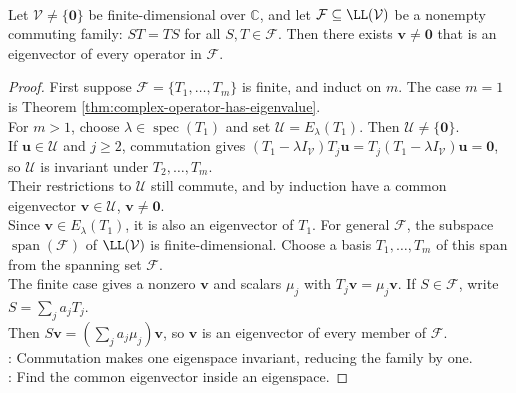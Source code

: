 \begin{theorem} \label{thm:commuting-family-common-eigenvector} \\
Let $\mathcal{V}\neq\{\mathbf{0}\}$ be finite-dimensional over $\mathbb{C}$, and let $\mathcal{F}\subseteq\LL(\mathcal{V})$ be a nonempty commuting family: $ST=TS$ for all $S,T\in\mathcal{F}$. Then there exists $\mathbf{v}\neq\mathbf{0}$ that is an eigenvector of every operator in $\mathcal{F}$.
\begin{proof} First suppose $\mathcal{F}=\{T_1,\ldots,T_m\}$ is finite, and induct on $m$. The case $m=1$ is Theorem \ref{thm:complex-operator-has-eigenvalue}.\\
For $m>1$, choose $\lambda\in\operatorname{spec}(T_1)$ and set $\mathcal{U}=E_{\lambda}(T_1)$. Then $\mathcal{U}\neq\{\mathbf{0}\}$.\\
If $\mathbf{u}\in\mathcal{U}$ and $j\geq2$, commutation gives $(T_1-\lambda I_{\mathcal{V}})T_j\mathbf{u} =T_j(T_1-\lambda I_{\mathcal{V}})\mathbf{u} =\mathbf{0}$, so $\mathcal{U}$ is invariant under $T_2,\ldots,T_m$.\\
Their restrictions to $\mathcal{U}$ still commute, and by induction have a common eigenvector $\mathbf{v}\in\mathcal{U}$, $\mathbf{v}\neq\mathbf{0}$.\\
Since $\mathbf{v}\in E_{\lambda}(T_1)$, it is also an eigenvector of $T_1$. For general $\mathcal{F}$, the subspace $\operatorname{span}(\mathcal{F})$ of $\LL(\mathcal{V})$ is finite-dimensional. Choose a basis $T_1,\ldots,T_m$ of this span from the spanning set $\mathcal{F}$.\\
The finite case gives a nonzero $\mathbf{v}$ and scalars $\mu_j$ with $T_j\mathbf{v}=\mu_j\mathbf{v}$. If $S\in\mathcal{F}$, write $S=\sum_j a_jT_j$.\\
Then $S\mathbf{v}=(\sum_j a_j\mu_j)\mathbf{v}$, so $\mathbf{v}$ is an eigenvector of every member of $\mathcal{F}$.\\
: Commutation makes one eigenspace invariant, reducing the family by one.\\
: Find the common eigenvector inside an eigenspace.
\end{proof}
\end{theorem}

